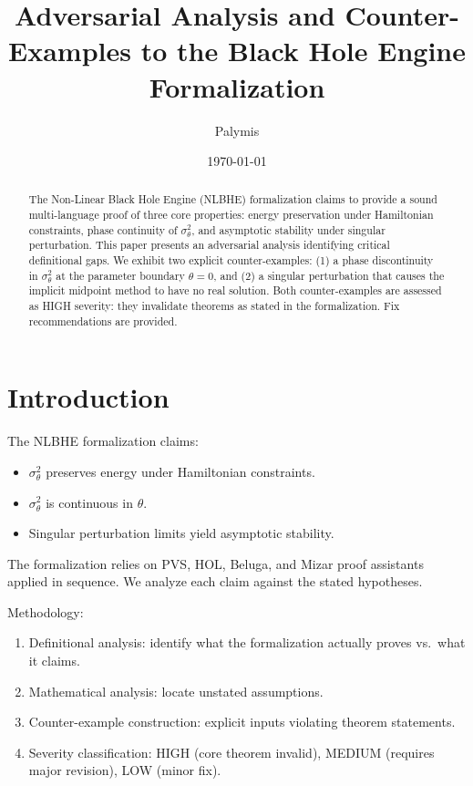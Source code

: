 \documentclass[11pt]{article}
\title{Adversarial Analysis and Counter-Examples to the Black Hole Engine Formalization}
\author{Palymis}
\date{\today}
\begin{document}
\maketitle

\begin{abstract}
The Non-Linear Black Hole Engine (NLBHE) formalization claims to provide a sound multi-language
proof of three core properties: energy preservation under Hamiltonian constraints, phase
continuity of $\sigma^2_\theta$, and asymptotic stability under singular perturbation. This
paper presents an adversarial analysis identifying critical definitional gaps. We exhibit two
explicit counter-examples: (1) a phase discontinuity in $\sigma^2_\theta$ at the parameter
boundary $\theta = 0$, and (2) a singular perturbation that causes the implicit midpoint
method to have no real solution. Both counter-examples are assessed as HIGH severity:
they invalidate theorems as stated in the formalization. Fix recommendations are provided.
\end{abstract}

\section{Introduction}

The NLBHE formalization \cite{nova2026} claims:
\begin{itemize}
\item[$(\mathbf{T_1})$] $\sigma^2_\theta$ preserves energy under Hamiltonian constraints.
\item[$(\mathbf{T_2})$] $\sigma^2_\theta$ is continuous in $\theta$.
\item[$(\mathbf{T_3})$] Singular perturbation limits yield asymptotic stability.
\end{itemize}
The formalization relies on PVS, HOL, Beluga, and Mizar proof assistants applied in sequence.
We analyze each claim against the stated hypotheses.

Methodology:
\begin{enumerate}[label=(\arabic*)]
\item Definitional analysis: identify what the formalization actually proves vs.\ what it claims.
\item Mathematical analysis: locate unstated assumptions.
\item Counter-example construction: explicit inputs violating theorem statements.
\item Severity classification: HIGH (core theorem invalid), MEDIUM (requires major revision),
LOW (minor fix).
\end{enumerate}
\end{document}
